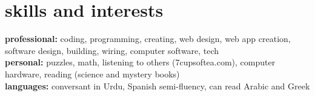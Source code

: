 \documentclass[]{friggeri-cv} %
\begin{document}

\section{skills and interests}

\textbf{professional:} coding, programming, creating, web design, web app creation, software design, building, wiring, computer software, tech 
\\ 
\textbf{personal:} puzzles, math, listening to others (7cupsoftea.com), computer hardware, reading (science and mystery books)   \\ 
\textbf{languages:} conversant in Urdu, Spanish semi-fluency, can read Arabic and Greek
\end{document}
